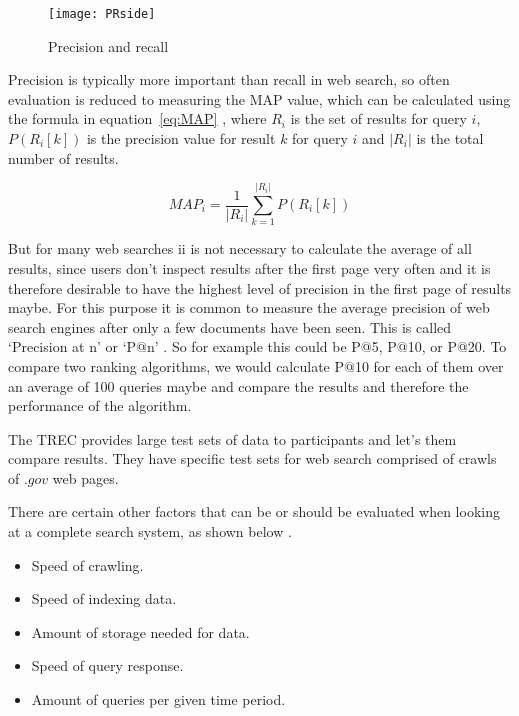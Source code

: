 \begin{figure}[!htbp]
  \centering
  \texttt{[image: PRside]}
  \caption[Precision and recall]{Precision and recall \autocite{Wikimedia2014}}
\label{fig:PR}
\end{figure}

Precision is typically more important than recall in web search, so often evaluation is reduced to measuring the \acf{MAP} value\marginpar{$\bm{\Sigma}$~\ref{eq:MAP}}, which can be calculated using the formula in equation~\ref{eq:MAP} \autocite{Baeza-Yates2011}, where $R_i$ is the set of results for query $i$, $P(R_i[k])$ is the precision value for result $k$ for query $i$ and $|R_i|$ is the total number of results.

\begin{equation}
  MAP_i = \frac{1}{|R_i|} \sum_{k=1}^{|R_i|} P(R_i[k])
\label{eq:MAP}
\end{equation}

But for many web searches ii is not necessary to calculate the average of all results, since users don't inspect results after the first page very often and it is therefore desirable to have the highest level of precision in the first page of results maybe. For this purpose it is common to measure the average precision of web search engines after only a few documents have been seen. This is called `Precision at n' or `P@n' \autocite{Baeza-Yates2011}. So for example this could be P@5, P@10, or P@20. To compare two ranking algorithms, we would calculate P@10 for each of them over an average of 100 queries maybe and compare the results and therefore the performance of the algorithm.

The \acf{TREC} \autocite{Nist2016} provides large test sets of data \autocite{Trec2011} to participants and let's them compare results. They have specific test sets for web search comprised of crawls of $.gov$ web pages.

There are certain other factors that can be or should be evaluated when looking at a complete search system, as shown below \autocite{Baeza-Yates2011}. 

\begin{itemize}
  \item Speed of crawling.
  \item Speed of indexing data.
  \item Amount of storage needed for data.
  \item Speed of query response.
  \item Amount of queries per given time period.
\end{itemize}

